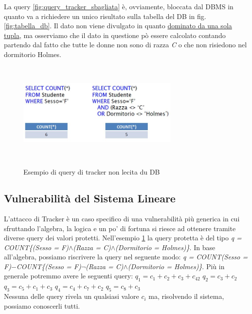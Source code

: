 La query \ref{fig:query_tracker_sbagliata} è, ovviamente, bloccata dal DBMS in quanto va a richiedere un unico risultato sulla tabella del DB in fig. \ref{fig:tabella_db}.
Il dato non viene divulgato in quanto \underline{dominato da una sola tupla}, ma osserviamo che il dato in questione pò essere calcolato contando partendo dal fatto che tutte le donne non sono di razza \textit{C} o che non risiedono nel dormitorio Holmes.

\begin{figure}[htpb]
\centering
	{\includegraphics[height=5cm, width=8cm, keepaspectratio]{Immagini/Appendice1/prot_dati_14.jpg}}
		\caption{Esempio di query di tracker non lecita du DB
				  \label{fig:query_tracker}}  
\end{figure}

\subsection{Vulnerabilità del Sistema Lineare}
L'attacco di Tracker è un caso specifico di una vulnerabilità più generica in cui sfruttando l'algebra, la logica e un po' di fortuna si riesce ad ottenere tramite diverse query dei valori protetti.
\newpage
Nell'esempio \ref{fig:query_tracker} la query protetta è del tipo \textit{q = COUNT\{(Sesso = F)}$\wedge$\textit{(Razza = C)}$\wedge$\textit{(Dormitorio = Holmes)\}}.
\newline
In base all'algebra, possiamo riscrivere la query nel seguente modo: 
\textit{q = COUNT(Sesso = F)}$-$\textit{COUNT\{(Sesso = F)}$\neg$\textit{(Razza = C)}$\wedge$\textit{(Dormitorio = Holmes)\}}.
\newline
Più in generale potremmo avere le seguenti query:
\newline
$q_{1} = c_{1} + c_{2} + c_{3} + c_{42}$
\newline
$q_{2} = c_{3} + c_{2} $
\newline
$q_{3} = c_{5} + c_{1} + c_{3}$
\newline
$q_{4} = c_{4} + c_{7} + c_{2}$
\newline
$q_{5} = c_{8} + c_{3}$
\\
Nessuna delle query rivela un qualsiasi valore $c_{i}$ ma, risolvendo il sistema, possiamo conoscerli tutti.

